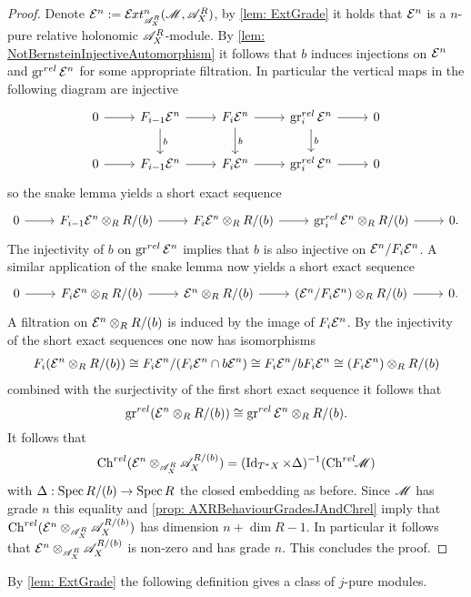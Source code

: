 \begin{proof}
  Denote $\E^n := \Ex{\A_X^R}{n}(\M,\A_X^R)$, by \cref{lem: ExtGrade} it holds that $\mathcal{E}^n$ is a $n$-pure relative holonomic $\mathscr{A}_X^R$-module.
  By \cref{lem: NotBernsteinInjectiveAutomorphism} it follows that $b$ induces injections on $\mathcal{E}^{n}$ and $\operatorname{gr}^{rel} \mathcal{E}^{n}$ for some appropriate filtration.
  In particular the vertical maps in the following diagram are injective
  $$\begin{tikzcd}
    0 \arrow{r} & F_{i-1} \E^n\arrow{r} \arrow{d}{b}& F_i \E^{n}\arrow{r} \arrow{d}{b}& \gr^{rel}_i \E^n\arrow{r}\arrow{d}{b} & 0\\
    0 \arrow{r} & F_{i-1} \E^n\arrow{r} & F_i \E^{n}\arrow{r} & \gr^{rel}_i \E^n\arrow{r} & 0
  \end{tikzcd} $$
  so the snake lemma yields a short exact sequence
  $$\begin{tikzcd}
    0 \arrow{r} & F_{i-1} \E^n\otimes_R R/(b)\arrow{r} & F_i \E^{n}\otimes_R R/(b)\arrow{r} & \gr^{rel}_i \E^n\arrow{r}\otimes_R R/(b) & 0.
  \end{tikzcd} $$
  The injectivity of $b$ on $\operatorname{gr}^{rel}\mathcal{E}^n$ implies that $b$ is also injective on $\mathcal{E}^n/F_i\mathcal{E}^n$. A similar application of the snake lemma now yields a short exact sequence
  $$\begin{tikzcd}
    0 \arrow{r} & F_{i} \E^n\otimes_R R/(b)\arrow{r} & \E^{n}\otimes_R R/(b)\arrow{r} & (\E^n/F_i \E^n )\arrow{r}\otimes_R R/(b) & 0.
  \end{tikzcd} $$
  A filtration on $\mathcal{E}^n \otimes_R R/(b)$ is induced by the image of $F_i\mathcal{E}^n$. By the injectivity of the short exact sequences one now has isomorphisms
  \begin{align*}
    F_i(\mathcal{E}^n \otimes_R R/(b)) \cong F_i\mathcal{E}^n / (F_i \mathcal{E}^n \cap b\mathcal{E}^n) \cong F_i \mathcal{E}^n / b F_i \mathcal{E}^n \cong  (F_i\mathcal{E}^n) \otimes_R R/(b)
  \end{align*}
  combined with the surjectivity of the first short exact sequence it follows that
  $$\operatorname{gr}^{rel}(\mathcal{E}^n \otimes_R R/(b)) \cong \operatorname{gr}^{rel}\mathcal{E}^n \otimes_R R/(b). $$
  It follows that
  $$\operatorname{Ch}^{rel}(\mathcal{E}^n \otimes_{\mathscr{A}_X^R} \mathscr{A}_X^{R/(b)})  = (\operatorname{Id}_{T^*X} \times \Delta)^{-1}(\operatorname{Ch}^{rel}\mkern-5mu \mathscr{M})$$
  with $\Delta: \operatorname{Spec} R/(b) \to \operatorname{Spec} R$ the closed embedding as before. Since $\mathscr{M}$ has grade $n$ this equality and \cref{prop: AXRBehaviourGradesJAndChrel} imply that $\operatorname{Ch}^{rel}(\mathcal{E}^n \otimes_{\mathscr{A}_X^R} \mathscr{A}_X^{R/(b)})$ has dimension $n + \dim R - 1$.
  In particular it follows that $\mathcal{E}^n \otimes_{\mathscr{A}_X^R} \mathscr{A}_X^{R/(b)}$ is non-zero and has grade $n$. This concludes the proof.
\end{proof}
By \cref{lem: ExtGrade} the following definition gives a class of $j$-pure modules.

